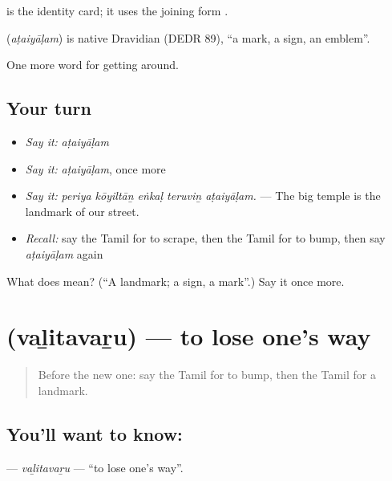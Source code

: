   is the identity card; it uses the joining form .

\begin{cousinweb}
\textbf{} (\emph{aṭaiyāḷam}) is native Dravidian (DEDR 89), \textquotedblleft{}a mark, a sign, an emblem\textquotedblright{}.
\end{cousinweb}

\begin{grammarlens}[title={What you've built}]
One more word for getting around.
\end{grammarlens}

\subsection*{Your turn}
\begin{itemize}
\raggedright
  \item \emph{Say it:} \emph{aṭaiyāḷam}
  \item \emph{Say it:} \emph{aṭaiyāḷam}, once more
  \item \emph{Say it:} \emph{periya kōyiltāṉ eṅkaḷ teruviṉ aṭaiyāḷam.} — The big temple is the landmark of our street.
  \item \emph{Recall:} say the Tamil for to scrape, then the Tamil for to bump, then say \emph{aṭaiyāḷam} again
\end{itemize}

\begin{tcolorbox}[breakable,colback=teal!4,colframe=teal!35!black,title={Before you move on}]
What does  mean? (\textquotedblleft{}A landmark; a sign, a mark\textquotedblright{}.) Say it once more.
\end{tcolorbox}
\section[\texorpdfstring{\ta{வழிதவறு} (vaḻitavaṟu)}{வழிதவறு (vaḻitavaṟu)}]{ (vaḻitavaṟu) — to lose one's way}

\label{lesson:TA-C412-valitavaru}



\begin{quote}
Before the new one: say the Tamil for to bump, then the Tamil for a landmark.
\end{quote}

\subsection*{You'll want to know: }
\textbf{} — \emph{vaḻitavaṟu} — \textquotedblleft{}to lose one's way\textquotedblright{}.

